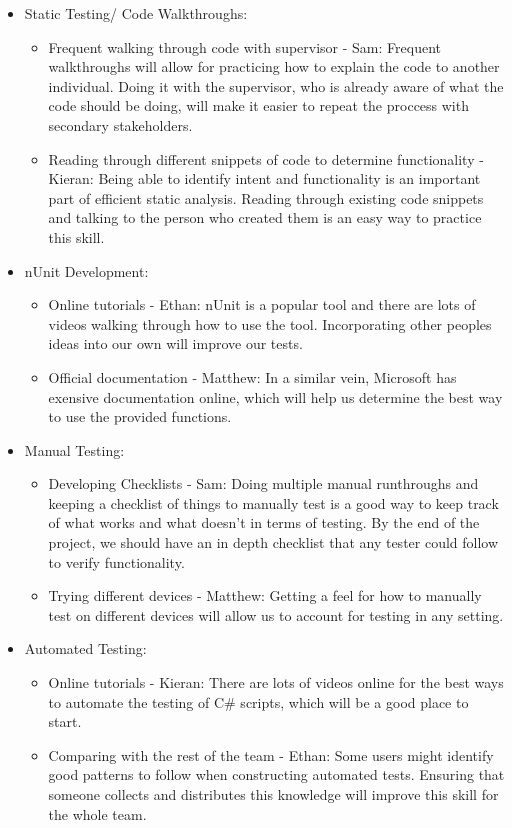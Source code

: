 \documentclass[12pt, titlepage]{article}
\begin{document}
\begin{enumerate}
  \begin{itemize}
      \item Static Testing/ Code Walkthroughs:
      \begin{itemize}
          \item Frequent walking through code with supervisor - Sam: Frequent walkthroughs will allow for practicing how to explain the code to another individual. Doing it with the supervisor, who is already aware of what the code should be doing, will make it easier to repeat the proccess with secondary stakeholders.
          \item Reading through different snippets of code to determine functionality - Kieran: Being able to identify intent and functionality is an important part of efficient static analysis. Reading through existing code snippets and talking to the person who created them is an easy way to practice this skill.
      \end{itemize}
      \item nUnit Development:
      \begin{itemize}
          \item Online tutorials - Ethan: nUnit is a popular tool and there are lots of videos walking through how to use the tool. Incorporating other peoples ideas into our own will improve our tests. 
          \item Official documentation - Matthew: In a similar vein, Microsoft has exensive documentation online, which will help us determine the best way to use the provided functions.
      \end{itemize}
      \item Manual Testing:
      \begin{itemize}
          \item Developing Checklists - Sam: Doing multiple manual runthroughs and keeping a checklist of things to manually test is a good way to keep track of what works and what doesn't in terms of testing. By the end of the project, we should have an in depth checklist that any tester could follow to verify functionality. 
          \item Trying different devices - Matthew: Getting a feel for how to manually test on different devices will allow us to account for testing in any setting. 
      \end{itemize}
      \item Automated Testing:
      \begin{itemize}
          \item Online tutorials - Kieran: There are lots of videos online for the best ways to automate the testing of C\# scripts, which will be a good place to start. 
          \item Comparing with the rest of the team - Ethan: Some users might identify good patterns to follow when constructing automated tests. Ensuring that someone collects and distributes this knowledge will improve this skill for the whole team.
      \end{itemize}
  \end{itemize}
\end{enumerate}
\end{document}
